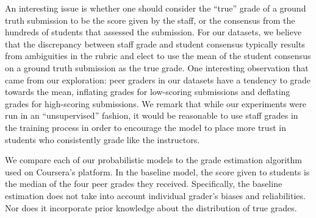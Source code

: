 An interesting issue is whether one should consider the ``true''
grade of a ground truth submission to be the score given by
the staff, or the consensus from the hundreds of students
that assessed the submission. For our datasets, we believe
that the discrepancy between staff grade and student consensus typically results from ambiguities in the rubric and
elect to use the mean of the student consensus on a ground
truth submission as the true grade. One interesting observation that came from our exploration: peer graders in our
datasets have a tendency to grade towards the mean, inflating
grades for low-scoring submissions and deflating grades for
high-scoring submissions. %
 We remark that
while our experiments were run in an ``unsupervised'' fashion, it would be reasonable to use staff grades
in the training process in order to encourage the model to
place more trust in students who consistently grade like the
instructors.

We compare each of our probabilistic models to the grade
estimation algorithm used on Coursera's platform. In the
baseline model, the score given to students is the median of
the four peer grades they received. Specifically, the baseline
estimation does not take into account individual grader's
biases and reliabilities. Nor does it incorporate prior knowledge about the distribution of true grades. 

